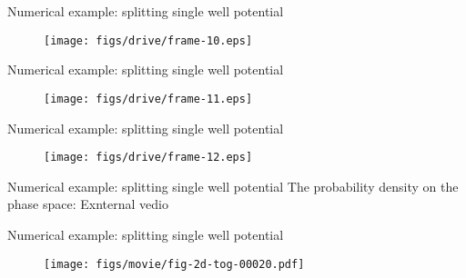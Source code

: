 \documentclass[fleqn]{beamer}
\begin{document}
\begin{frame}{Numerical example: splitting single well potential}
  \addtocounter{framenumber}{-1}
  \begin{figure}
    \texttt{[image: figs/drive/frame-10.eps]}
  \end{figure}  
\end{frame}

\begin{frame}{Numerical example: splitting single well potential}
  \addtocounter{framenumber}{-1}
  \begin{figure}
    \texttt{[image: figs/drive/frame-11.eps]}
  \end{figure}  
\end{frame}

\begin{frame}{Numerical example: splitting single well potential}
  \addtocounter{framenumber}{-1}
  \begin{figure}
    \texttt{[image: figs/drive/frame-12.eps]}
  \end{figure}  
\end{frame}




\begin{frame}{Numerical example: splitting single well potential}
  The probability density on the phase space: Exnternal vedio
  \begin{figure}[ht]
  \end{figure}
\end{frame}

\begin{frame}{Numerical example: splitting single well potential}
  \begin{figure}
    \texttt{[image: figs/movie/fig-2d-tog-00020.pdf]}
  \end{figure}  
\end{frame}
\end{document}
